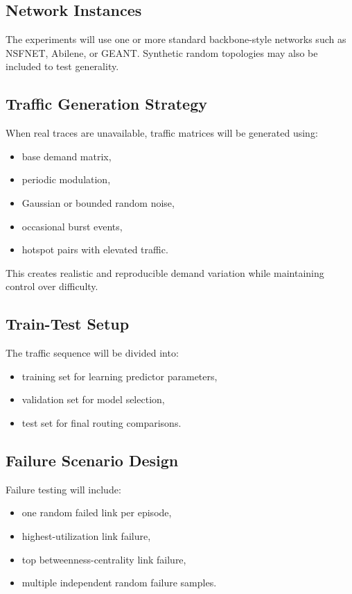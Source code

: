 \documentclass[11pt]{article}
\begin{document}
\subsection{Network Instances}
The experiments will use one or more standard backbone-style networks such as NSFNET, Abilene, or GEANT. Synthetic random topologies may also be included to test generality.

\subsection{Traffic Generation Strategy}
When real traces are unavailable, traffic matrices will be generated using:
\begin{itemize}
    \item base demand matrix,
    \item periodic modulation,
    \item Gaussian or bounded random noise,
    \item occasional burst events,
    \item hotspot pairs with elevated traffic.
\end{itemize}

This creates realistic and reproducible demand variation while maintaining control over difficulty.

\subsection{Train-Test Setup}
The traffic sequence will be divided into:
\begin{itemize}
    \item training set for learning predictor parameters,
    \item validation set for model selection,
    \item test set for final routing comparisons.
\end{itemize}

\subsection{Failure Scenario Design}
Failure testing will include:
\begin{itemize}
    \item one random failed link per episode,
    \item highest-utilization link failure,
    \item top betweenness-centrality link failure,
    \item multiple independent random failure samples.
\end{itemize}
\end{document}
